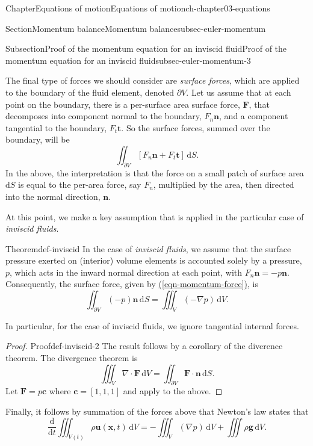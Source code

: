 \documentclass[oneside,10pt,]{book}
\newcommand{\xreffont}{\relax}
\numberwithin{equation}{section}
\newcommand{\de}{\mathrm{d}}
\newcommand{\dd}[2]{\frac{\de#1}{\de#2}}
\newcommand{\bx}{\boldsymbol{x}}
\newcommand{\bn}{\boldsymbol{n}}
\newcommand{\bt}{\boldsymbol{t}}
\newcommand{\bu}{\boldsymbol{u}}
\newcommand{\bg}{\boldsymbol{g}}
\newcommand{\bF}{\boldsymbol{F}}
\begin{document}
\begin{chapterptx}{Chapter}{Equations of motion}{}{Equations of motion}{}{}{ch-chapter03-equations}
\begin{sectionptx}{Section}{Momentum balance}{}{Momentum balance}{}{}{subsec-euler-momentum}
\begin{subsectionptx}{Subsection}{Proof of the momentum equation for an inviscid fluid}{}{Proof of the momentum equation for an inviscid fluid}{}{}{subsec-euler-momentum-3}
\par
The final type of forces we should consider are \emph{surface forces}, which are applied to the boundary of the fluid element, denoted \(\partial V\). Let us assume that at each point on the boundary, there is a per-surface area surface force, \(\bF\), that decomposes into component normal to the boundary, \(F_n \bn\), and a component tangential to the boundary, \(F_t \bt\). So the surface forces, summed over the boundary, will be%
\begin{equation}
\iint_{\partial V} \left[ F_n \bn + F_t \bt\right] \, \de{S}.\label{eqn-momentum-force}
\end{equation}
In the above, the interpretation is that the force on a small patch of surface area \(\de{S}\) is equal to the per-area force, say \(F_n\), multiplied by the area, then directed into the normal direction, \(\bn\).%
\par
At this point, we make a key assumption that is applied in the particular case of \emph{inviscid fluids}.%
\begin{theorem}{Theorem}{}{}{def-inviscid}%
In the case of \emph{inviscid fluids}, we assume that the surface pressure exerted on (interior) volume elements is accounted solely by a pressure, \(p\), which acts in the inward normal direction at each point, with \(F_n \bn = -p \bn\). Consequently, the surface force, given by \hyperref[eqn-momentum-force]{({\xreffont\ref{eqn-momentum-force}})}, is%
\begin{equation}
\iint_{\partial V} (-p) \bn \, \de{S} = \iiint_V (-\nabla p) \, \de{V}.\label{eqn-eqn-momentum-pressure}
\end{equation}
%
\par
In particular, for the case of inviscid fluids, we ignore tangential internal forces.%
\end{theorem}
\begin{proof}{Proof}{}{def-inviscid-2}
The result follows by a corollary of the diverence theorem. The divergence theorem is%
\begin{equation*}
\iiint_V \nabla \cdot \bF \, \de{V} = \iint_{\partial V} \bF \cdot \bn \, \de{S}.
\end{equation*}
Let \(\bF = p \boldsymbol{c}\) where \(\boldsymbol{c} = [1, 1, 1]\) and apply to the above.%
\end{proof}
Finally, it follows by summation of the forces above that Newton's law states that%
\begin{equation*}
\dd{}{t} \iiint_{V(t)} \rho \bu(\bx, t) \, \de{V} = -\iiint_V (\nabla p) \, \de{V} + \iiint \rho \bg \, \de{V}.

\end{equation*}
\end{subsectionptx}
\end{sectionptx}
\end{chapterptx}
\end{document}
